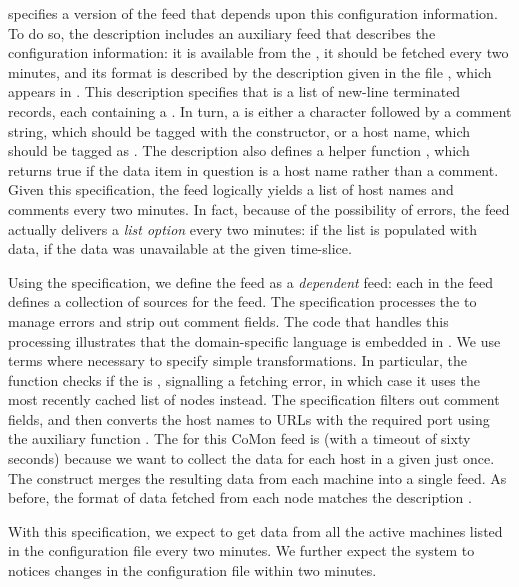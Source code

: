  specifies a version of the  feed that
depends upon this configuration information.  To do so, the
description includes an auxiliary feed  that describes the
configuration information: it is available from the
, it should be fetched every two minutes, and its
format is described by the \padsml{} description  given in
the file , which appears in .
This \padsml{} description specifies that  is a list of
new-line terminated records, each containing a .  In
turn, a  is either a  character followed by a
comment string, which should be tagged with the 
constructor, or a host name, which should be tagged as
. The description also defines a helper function ,
which returns true if the data item in question is a host name
rather than a comment.  Given this specification, the  feed
logically yields a list of host names and comments every two minutes.
In fact, because of the possibility of errors, the feed actually
delivers a {\em list option} every two minutes:  if the list is
populated with data,  if the data was unavailable at the
given time-slice.

Using the  specification, we define the  feed as a
\textit{dependent} feed: each  in the  feed defines a
collection of sources for the  feed.  The  
specification processes the  to manage errors and strip
out comment fields.  The code that handles this processing illustrates
that the \padsd{} domain-specific language is embedded in \ocaml{}.
We use \ocaml{} terms where necessary to specify simple
transformations.  In particular, the  function checks if
the  is , signalling a fetching error, in which
case it uses the most recently cached list of nodes instead.  The
 specification filters out comment fields, and then
converts the host names to URLs with the required port using the
auxiliary function .  The  for this CoMon
feed is  (with a timeout of sixty seconds) because we want to
collect the data for each host in a given  just once.
The  construct merges the resulting data from
each machine into a single feed.  As
before, the format of data fetched from each node matches the
description .  

With this specification, we
expect to get data from all the active machines listed in the
configuration file every two minutes.  We further expect the system to
notices changes in the configuration file within two minutes.





